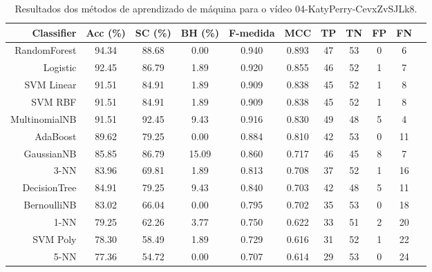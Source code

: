\begin{table}[!htb]
\centering
\caption{Resultados dos métodos de aprendizado de máquina para o vídeo 04-KatyPerry-CevxZvSJLk8.}
\label{tab:04-KatyPerry-CevxZvSJLk8}
\begin{tabular}{r|c|c|c|c|c|c|c|c|c|c}
\hline\hline
Classifier & Acc (\%) & SC (\%) & BH (\%) & F-medida & MCC & TP & TN & FP & FN \\ \hline
RandomForest & 94.34 & 88.68 & 0.00 & 0.940 & 0.893 & 47 & 53 & 0 & 6 \\ 
Logistic & 92.45 & 86.79 & 1.89 & 0.920 & 0.855 & 46 & 52 & 1 & 7 \\ 
SVM Linear & 91.51 & 84.91 & 1.89 & 0.909 & 0.838 & 45 & 52 & 1 & 8 \\ 
SVM RBF & 91.51 & 84.91 & 1.89 & 0.909 & 0.838 & 45 & 52 & 1 & 8 \\ 
MultinomialNB & 91.51 & 92.45 & 9.43 & 0.916 & 0.830 & 49 & 48 & 5 & 4 \\ 
AdaBoost & 89.62 & 79.25 & 0.00 & 0.884 & 0.810 & 42 & 53 & 0 & 11 \\ 
GaussianNB & 85.85 & 86.79 & 15.09 & 0.860 & 0.717 & 46 & 45 & 8 & 7 \\ 
3-NN & 83.96 & 69.81 & 1.89 & 0.813 & 0.708 & 37 & 52 & 1 & 16 \\ 
DecisionTree & 84.91 & 79.25 & 9.43 & 0.840 & 0.703 & 42 & 48 & 5 & 11 \\ 
BernoulliNB & 83.02 & 66.04 & 0.00 & 0.795 & 0.702 & 35 & 53 & 0 & 18 \\ 
1-NN & 79.25 & 62.26 & 3.77 & 0.750 & 0.622 & 33 & 51 & 2 & 20 \\ 
SVM Poly & 78.30 & 58.49 & 1.89 & 0.729 & 0.616 & 31 & 52 & 1 & 22 \\ 
5-NN & 77.36 & 54.72 & 0.00 & 0.707 & 0.614 & 29 & 53 & 0 & 24 \\ 
\hline\hline
\end{tabular}
\end{table}
